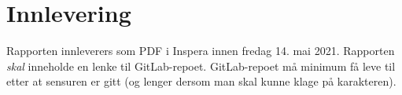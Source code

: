 \documentclass[11pt,a4paper]{article}
\begin{document}
\section{Innlevering}

Rapporten innleverers som PDF i Inspera innen fredag 14. mai 2021. Rapporten \emph{skal} inneholde en lenke til GitLab-repoet. GitLab-repoet må minimum få leve til etter at sensuren er gitt (og lenger dersom man skal kunne klage på karakteren).



\end{document}
